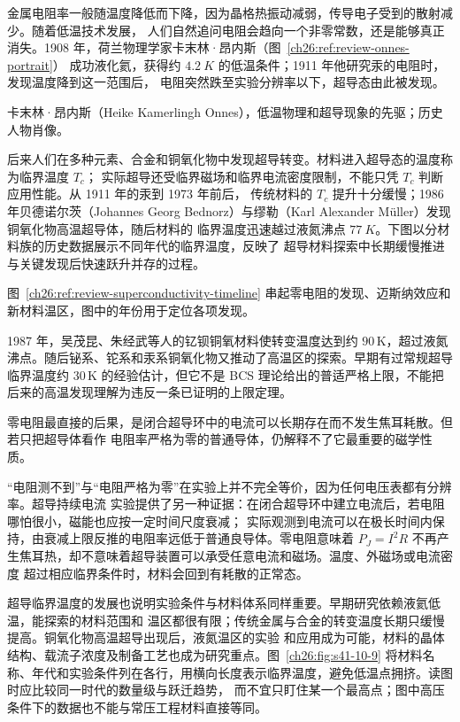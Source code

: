 {金属电阻率一般随温度降低而下降，因为晶格热振动减弱，传导电子受到的散射减少。随着低温技术发展，
人们自然追问电阻会趋向一个非零常数，还是能够真正消失。1908 年，荷兰物理学家卡末林·昂内斯（图~\ref{ch26:ref:review-onnes-portrait}）
成功液化氦，获得约 $\SI{4.2}{K}$ 的低温条件；1911 年他研究汞的电阻时，发现温度降到这一范围后，
电阻突然跌至实验分辨率以下，超导态由此被发现。

%
{卡末林·昂内斯（Heike Kamerlingh Onnes），低温物理和超导现象的先驱；历史人物肖像。\label{ch26:ref:review-onnes-portrait}}\label{ch26:fig:s41-10-8}

后来人们在多种元素、合金和铜氧化物中发现超导转变。材料进入超导态的温度称为临界温度 $T_c$；
实际超导还受临界磁场和临界电流密度限制，不能只凭 $T_c$ 判断应用性能。从 1911 年的汞到 1973 年前后，
传统材料的 $T_c$ 提升十分缓慢；1986 年贝德诺尔茨（Johannes Georg Bednorz）与缪勒（Karl Alexander M\"uller）发现铜氧化物高温超导体，随后材料的
临界温度迅速越过液氮沸点 $\SI{77}{K}$。下图以分材料族的历史数据展示不同年代的临界温度，反映了
超导材料探索中长期缓慢推进与关键发现后快速跃升并存的过程。

图~\ref{ch26:ref:review-superconductivity-timeline} 串起零电阻的发现、迈斯纳效应和新材料温区，图中的年份用于定位各项发现。

\superconductivityTimeline

\superconductivityChartFaithful

1987 年，吴茂昆、朱经武等人的钇钡铜氧材料使转变温度达到约 $90\,$K，超过液氮沸点。随后铋系、铊系和汞系铜氧化物又推动了高温区的探索。早期有过常规超导临界温度约 $30\,$K 的经验估计，但它不是 BCS 理论给出的普适严格上限，不能把后来的高温发现理解为违反一条已证明的上限定理。

零电阻最直接的后果，是闭合超导环中的电流可以长期存在而不发生焦耳耗散。但若只把超导体看作
电阻率严格为零的普通导体，仍解释不了它最重要的磁学性质。

“电阻测不到”与“电阻严格为零”在实验上并不完全等价，因为任何电压表都有分辨率。超导持续电流
实验提供了另一种证据：在闭合超导环中建立电流后，若电阻哪怕很小，磁能也应按一定时间尺度衰减；
实际观测到电流可以在极长时间内保持，由衰减上限反推的电阻率远低于普通良导体。零电阻意味着
$P_J=I^2R$ 不再产生焦耳热，却不意味着超导装置可以承受任意电流和磁场。温度、外磁场或电流密度
超过相应临界条件时，材料会回到有耗散的正常态。

超导临界温度的发展也说明实验条件与材料体系同样重要。早期研究依赖液氦低温，能探索的材料范围和
温区都很有限；传统金属与合金的转变温度长期只缓慢提高。铜氧化物高温超导出现后，液氮温区的实验
和应用成为可能，材料的晶体结构、载流子浓度及制备工艺也成为研究重点。图~\ref{ch26:fig:s41-10-9} 将材料名称、年代和实验条件列在各行，用横向长度表示临界温度，避免低温点拥挤。读图时应比较同一时代的数量级与跃迁趋势，
而不宜只盯住某一个最高点；图中高压条件下的数据也不能与常压工程材料直接等同。


}
